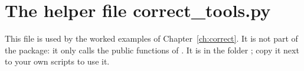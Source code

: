 \chapter{The helper file correct\_tools.py}
\label{app:correcttools}

This file is used by the worked examples of Chapter~\ref{ch:correct}. It is not part of the package: it only calls the public functions
of \mcams. It is in the folder ; copy it next to your own scripts to use it.


